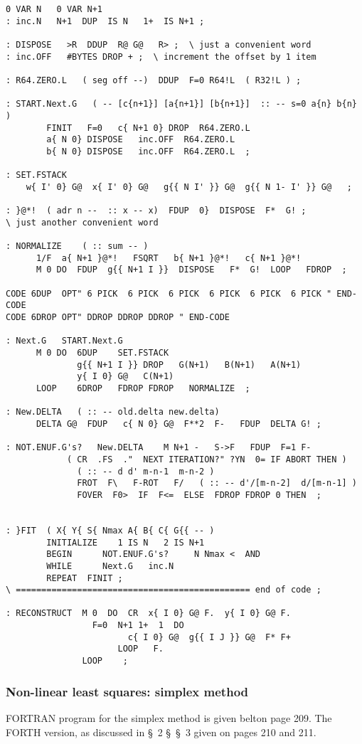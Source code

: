 \begin{lstlisting}
0 VAR N   0 VAR N+1
: inc.N   N+1  DUP  IS N   1+  IS N+1 ;

: DISPOSE   >R  DDUP  R@ G@   R> ;  \ just a convenient word
: inc.OFF   #BYTES DROP + ;  \ increment the offset by 1 item

: R64.ZERO.L   ( seg off --)  DDUP  F=0 R64!L  ( R32!L ) ;  

: START.Next.G   ( -- [c{n+1}] [a{n+1}] [b{n+1}]  :: -- s=0 a{n} b{n} )
        FINIT   F=0   c{ N+1 0} DROP  R64.ZERO.L
        a{ N 0} DISPOSE   inc.OFF  R64.ZERO.L
        b{ N 0} DISPOSE   inc.OFF  R64.ZERO.L  ;

: SET.FSTACK   
    w{ I' 0} G@  x{ I' 0} G@   g{{ N I' }} G@  g{{ N 1- I' }} G@   ;

: }@*!  ( adr n --  :: x -- x)  FDUP  0}  DISPOSE  F*  G! ;
\ just another convenient word

: NORMALIZE    ( :: sum -- )  
      1/F  a{ N+1 }@*!   FSQRT   b{ N+1 }@*!   c{ N+1 }@*!
      M 0 DO  FDUP  g{{ N+1 I }}  DISPOSE   F*  G!  LOOP   FDROP  ;

CODE 6DUP  OPT" 6 PICK  6 PICK  6 PICK  6 PICK  6 PICK  6 PICK " END-CODE
CODE 6DROP OPT" DDROP DDROP DDROP " END-CODE

: Next.G   START.Next.G 
      M 0 DO  6DUP    SET.FSTACK
              g{{ N+1 I }} DROP   G(N+1)   B(N+1)   A(N+1)
              y{ I 0} G@   C(N+1)
      LOOP    6DROP   FDROP FDROP   NORMALIZE  ;

: New.DELTA   ( :: -- old.delta new.delta)
      DELTA G@  FDUP   c{ N 0} G@  F**2  F-   FDUP  DELTA G! ;

: NOT.ENUF.G's?   New.DELTA    M N+1 -   S->F   FDUP  F=1 F- 
            ( CR  .FS  ."  NEXT ITERATION?" ?YN  0= IF ABORT THEN )
              ( :: -- d d' m-n-1  m-n-2 )  
              FROT  F\   F-ROT   F/   ( :: -- d'/[m-n-2]  d/[m-n-1] )
              FOVER  F0>  IF  F<=  ELSE  FDROP FDROP 0 THEN  ;


: }FIT  ( X{ Y{ S{ Nmax A{ B{ C{ G{{ -- )
        INITIALIZE    1 IS N   2 IS N+1
        BEGIN      NOT.ENUF.G's?     N Nmax <  AND 
        WHILE      Next.G   inc.N
        REPEAT  FINIT ;
\ ============================================== end of code ;

: RECONSTRUCT  M 0  DO  CR  x{ I 0} G@ F.  y{ I 0} G@ F. 
                 F=0  N+1 1+  1  DO 
                        c{ I 0} G@  g{{ I J }} G@  F* F+ 
                      LOOP   F. 
               LOOP    ;
\end{lstlisting}

\subsubsection{Non-linear least squares: simplex method}
 FORTRAN program for the simplex method is given belton page 209. The FORTH version, as discussed in \S\ 2 \S\ \S\ 3 given on pages 210 and 211.

